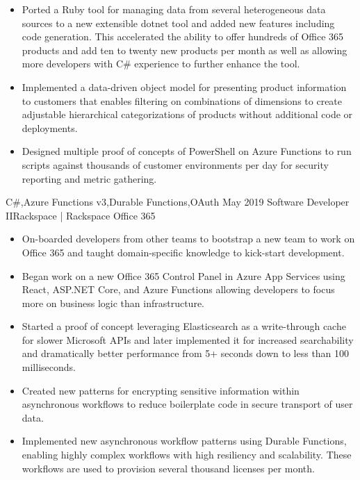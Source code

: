 \begin{experiences}
{\begin{itemize}
                        \ifcv
                        \item Ported a Ruby tool for managing data from several heterogeneous data sources to a new extensible dotnet tool and added new features including code generation. This accelerated the ability to offer hundreds of Office 365 products and add ten to twenty new products per month as well as allowing more developers with C\# experience to further enhance the tool.
                        \item Implemented a data-driven object model for presenting product information to customers that enables filtering on combinations of dimensions to create adjustable hierarchical categorizations of products without additional code or deployments.
                        \item Designed multiple proof of concepts of PowerShell on Azure Functions to run scripts against thousands of customer environments per day for security reporting and metric gathering.
                        \fi
                      \end{itemize}
                    }
                    {C\#,Azure Functions v3,Durable Functions,OAuth}
  \emptySeparator
  \experience
    {May 2019}     {Software Developer II}{Rackspace | Rackspace Office 365}
    {}
                    {
                      \begin{itemize}
                        \item On-boarded developers from other teams to bootstrap a new team to work on Office 365 and taught domain-specific knowledge to kick-start development.
                        \item Began work on a new Office 365 Control Panel in Azure App Services using React, ASP.NET Core, and Azure Functions allowing developers to focus more on business logic than infrastructure.
                        \item Started a proof of concept leveraging Elasticsearch as a write-through cache for slower Microsoft APIs and later implemented it for increased searchability and dramatically better performance from 5+ seconds down to less than 100 milliseconds.
                        \item Created new patterns for encrypting sensitive information within asynchronous workflows to reduce boilerplate code in secure transport of user data.
                        \item Implemented new asynchronous workflow patterns using Durable Functions, enabling highly complex workflows with high resiliency and scalability. These workflows are used to provision several thousand licenses per month.

\end{itemize}}
\end{experiences}

